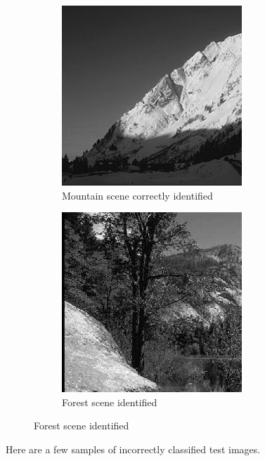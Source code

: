 \begin{homeworkProblem}
\begin{figure}[H]
\begin{subfigure}{0.5\textwidth}
    \end{subfigure}%
    \begin{subfigure}{0.5\textwidth}
      \centering
      \caption{Mountain scene correctly identified}
      \includegraphics[width=.5\linewidth]{./images/own/mountain_match_4.jpg}
    \end{subfigure}
    \begin{subfigure}{0.5\textwidth}
      \centering
      \caption{Forest scene identified}
      \includegraphics[width=.5\linewidth]{./images/own/forest_match_5.jpg}
    \end{subfigure}%
  \end{figure}

  \pagebreak

  Here are a few samples of incorrectly classified test images.


\end{homeworkProblem}
